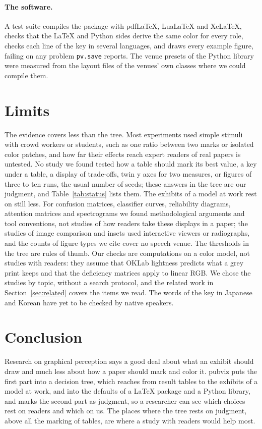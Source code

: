\documentclass[11pt]{article}
\newcommand\code[1]{\texttt{#1}}
\begin{document}
\paragraph{The software.} A test suite compiles the package with pdfLaTeX,
LuaLaTeX and XeLaTeX, checks that the LaTeX and Python sides derive the same
color for every role, checks each line of the key in several languages, and
draws every example figure, failing on any problem \code{pv.save} reports. The
venue presets of the Python library were measured from the layout files of
the venues' own classes where we could compile them.

\section{Limits}\label{sec:limits}

The evidence covers less than the tree. Most experiments used simple stimuli
with crowd workers or students, such as one ratio between two marks or
isolated color patches, and how far their effects reach expert readers of
real papers is untested. No study we found tested how a table should mark its
best value, a key under a table, a display of trade-offs, twin y axes for two
measures, or figures of three to ten runs, the usual number of seeds; these
answers in the tree are our judgment, and Table~\ref{tab:status} lists them.
The exhibits of a model at work rest on still less. For confusion matrices,
classifier curves, reliability diagrams, attention matrices and spectrograms
we found methodological arguments and tool conventions, not studies of how
readers take these displays in a paper; the studies of image comparison and
insets used interactive viewers or radiographs, and the counts of figure
types we cite cover no speech venue.
The thresholds in the tree are rules of thumb. Our checks are computations on
a color model, not studies with readers: they assume that OKLab lightness
predicts what a grey print keeps and that the deficiency matrices apply to
linear RGB. We chose the studies by topic, without a search protocol, and the
related work in Section~\ref{sec:related} covers the items we read. The words
of the key in Japanese and Korean have yet to be checked by native speakers.

\section{Conclusion}\label{sec:conclusion}

Research on graphical perception says a good deal about what an exhibit
should draw and much less about how a paper should mark and color it.
pubviz puts the first part into a decision tree, which reaches from result
tables to the exhibits of a model at work, and into the defaults of a LaTeX
package and a Python library, and marks the second part as judgment,
so a researcher can see which choices rest on readers and which on us. The
places where the tree rests on judgment, above all the marking of tables, are
where a study with readers would help most.



\end{document}
